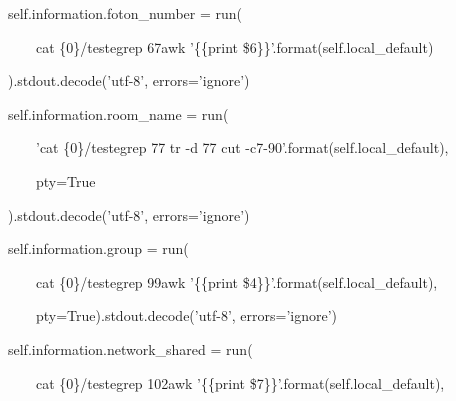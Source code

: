     \bigskip

{\ttfamily\color[rgb]{0.10980392,0.10980392,0.10980392}
    \ \ \ \ \ \ \ \ self.information.foton\_number = run(}

            {\ttfamily\color[rgb]{0.10980392,0.10980392,0.10980392}
            \ \ \ \ \ \ \ \ \ \ \ \ {\textquotedbl}cat \{0\}/teste{\textbar}grep 67{\textbar}awk '\{\{print
            \$6\}\}'{\textquotedbl}.format(self.local\_default)}

            {\ttfamily\color[rgb]{0.10980392,0.10980392,0.10980392}
            \ \ \ \ \ \ \ \ ).stdout.decode('utf-8', errors='ignore')}


    \bigskip

{\ttfamily\color[rgb]{0.10980392,0.10980392,0.10980392}
    \ \ \ \ \ \ \ \ self.information.room\_name = run(}

            {\ttfamily\color[rgb]{0.10980392,0.10980392,0.10980392}
            \ \ \ \ \ \ \ \ \ \ \ \ {}'cat \{0\}/teste{\textbar}grep 77 {\textbar}tr -d 77 {\textbar}cut
            -c7-90'.format(self.local\_default),}

            {\ttfamily\color[rgb]{0.10980392,0.10980392,0.10980392}
            \ \ \ \ \ \ \ \ \ \ \ \ pty=True}

            {\ttfamily\color[rgb]{0.10980392,0.10980392,0.10980392}
            \ \ \ \ \ \ \ \ ).stdout.decode('utf-8', errors='ignore')}


    \bigskip

{\ttfamily\color[rgb]{0.10980392,0.10980392,0.10980392}
    \ \ \ \ \ \ \ \ self.information.group = run(}

            {\ttfamily\color[rgb]{0.10980392,0.10980392,0.10980392}
            \ \ \ \ \ \ \ \ \ \ \ \ {\textquotedbl}cat \{0\}/teste{\textbar}grep 99{\textbar}awk '\{\{print
            \$4\}\}'{\textquotedbl}.format(self.local\_default),}

            {\ttfamily\color[rgb]{0.10980392,0.10980392,0.10980392}
            \ \ \ \ \ \ \ \ \ \ \ \ pty=True).stdout.decode('utf-8', errors='ignore')}


    \bigskip

{\ttfamily\color[rgb]{0.10980392,0.10980392,0.10980392}
    \ \ \ \ \ \ \ \ self.information.network\_shared = run(}

            {\ttfamily\color[rgb]{0.10980392,0.10980392,0.10980392}
            \ \ \ \ \ \ \ \ \ \ \ \ {\textquotedbl}cat \{0\}/teste{\textbar}grep 102{\textbar}awk '\{\{print
            \$7\}\}'{\textquotedbl}.format(self.local\_default),}


